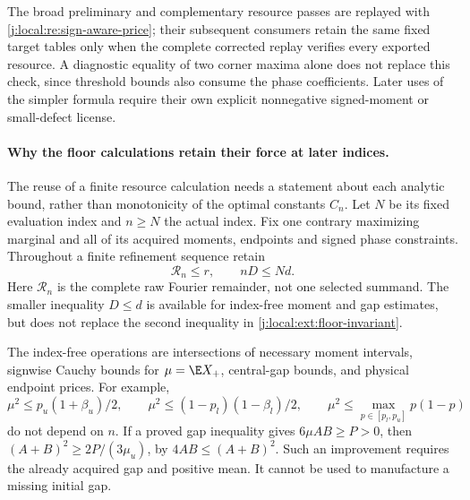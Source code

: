 The broad preliminary and complementary resource passes are replayed with
\eqref{j:local:re:sign-aware-price}; their subsequent consumers retain the same
fixed target tables only when the complete corrected replay verifies every
exported resource. A diagnostic equality of two corner maxima alone does
not replace this check, since threshold bounds also consume the phase
coefficients. Later uses of the simpler formula require their own explicit
nonnegative signed-moment or small-defect license.




\paragraph{Why the floor calculations retain their force at later indices.}
\label{j:local:transfer}
The reuse of a finite resource calculation needs a statement about each
analytic bound, rather than monotonicity of the optimal constants $C_n$.
Let $N$ be its fixed evaluation index and $n\ge N$ the actual index.
Fix one contrary maximizing marginal and all of its acquired moments,
endpoints and signed phase constraints. Throughout a finite refinement
sequence retain
\begin{equation}\label{j:local:ext:floor-invariant}
 \mathcal R_n\le r,\qquad nD\le Nd.
\end{equation}
Here $\mathcal R_n$ is the complete raw Fourier remainder, not one
selected summand. The smaller inequality $D\le d$ is available for
index-free moment and gap estimates, but does not replace the second
inequality in \eqref{j:local:ext:floor-invariant}.

The index-free operations are intersections of necessary moment
intervals, signwise Cauchy bounds for $\mu=\E X_+$, central-gap
bounds, and physical endpoint prices. For example,
\[
 \mu^2\le p_u(1+\beta_u)/2,\qquad
 \mu^2\le(1-p_l)(1-\beta_l)/2,\qquad
 \mu^2\le\max_{p\in[p_l,p_u]}p(1-p)
\]
do not depend on $n$. If a proved gap inequality gives $6\mu AB\ge P>0$,
then $(A+B)^2\ge2P/(3\mu_u)$, by $4AB\le(A+B)^2$.
Such an improvement requires the already acquired gap and positive mean.
It cannot be used to manufacture a missing initial gap.

